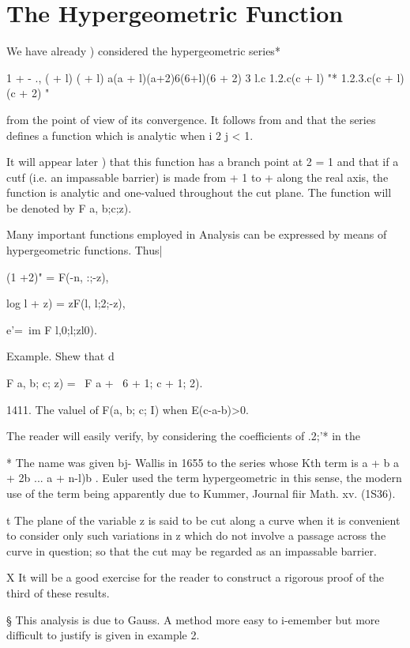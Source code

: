 \chapter{The Hypergeometric Function} 


We have already ) considered the hypergeometric series*

1 + - ., ( + l) ( + l) a(a + l)(a+2)6(6+l)(6 + 2) 3 l.c 1.2.c(c + l)
"* 1.2.3.c(c + l)(c + 2) " 

from the point of view of its convergence. It follows from and that the series defines a function which is analytic when i 2 j
< 1.

It will appear later ) that this function has a branch point
at 2 = 1 and that if a cutf (i.e. an impassable barrier) is made from
+ 1 to + along the real axis, the function is analytic and one-valued
throughout the cut plane. The function will be denoted by F a, b;c;z).

Many important functions employed in Analysis can be expressed by
means of hypergeometric functions. Thus|

(1 +2)" = F(-n, :;-z),

log l + z) = zF(l, l;2;-z),

e'=\ im F l,0;l;zl0).

Example. Shew that d

F a, b; c; z) = ~F a + \, 6 + 1; c + 1; 2).

1411. The valuel of F(a, b; c; I) when E(c-a-b)>0.

The reader will easily verify, by considering the coefficients of
.2;'* in the

* The name was given bj- Wallis in 1655 to the series whose Kth term
is a + b a + 2b ... a + n-l)b . Euler used the term hypergeometric in
this sense, the modern use of the term being apparently due to Kummer,
Journal fiir Math. xv. (1S36).

t The plane of the variable z is said to be cut along a curve when it
is convenient to consider only such variations in z which do not
involve a passage across the curve in question; so that the cut may
be regarded as an impassable barrier.

X It will be a good exercise for the reader to construct a rigorous
proof of the third of these results.

§ This analysis is due to Gauss. A method more easy to i-emember but
more difficult to justify is given in example 2.

